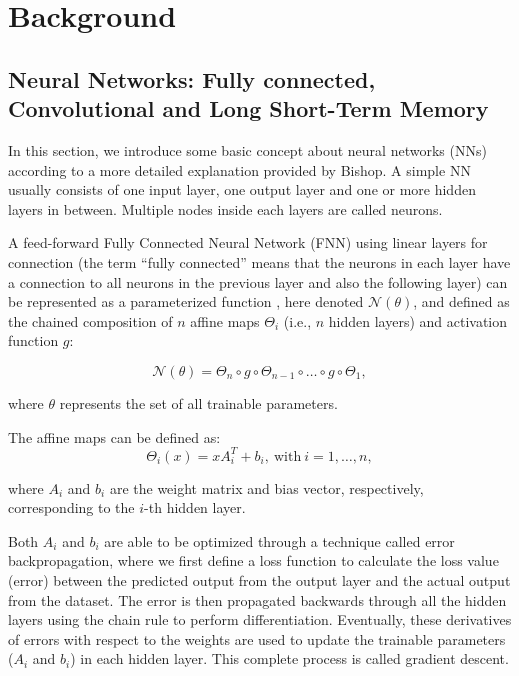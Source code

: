 \chapter{Background}\label{chap:background}


\section{Neural Networks: Fully connected, Convolutional and Long Short-Term Memory}

In this section, we introduce some basic concept about neural networks (NNs) according to a more detailed explanation provided by Bishop. \citep{10.1117_1.2819119} A simple NN usually consists of one input layer, one output layer and one or more hidden layers in between. Multiple nodes inside each layers are called neurons. 

A feed-forward Fully Connected Neural Network (FNN) using linear layers for connection (the term “fully connected” means that the neurons in each layer have a connection to all neurons in the previous layer and also the following layer) can be represented as a parameterized function \citep{2306.06304}, here denoted $\mathcal{N}(\theta)$, and defined as the chained composition of $n$ affine maps $\Theta_i$ (i.e., $n$ hidden layers) and activation function $g$:

\begin{equation*}
\mathcal{N}(\theta) = \Theta_n \circ g \circ \Theta_{n-1} \circ \ldots \circ g \circ \Theta_1,
\end{equation*}

where $\theta$ represents the set of all trainable parameters.

The affine maps can be defined as:
\begin{equation*} 
\Theta_i(x) = xA_i^{T} + b_i, \ \mathrm{with} \ i=1,\ldots,n, 
\end{equation*}

where $A_i$ and $b_i$ are the weight matrix and bias vector, respectively, corresponding to the $i$-th hidden layer.

Both $A_i$ and $b_i$ are able to be optimized through a technique called error backpropagation, where we first define a loss function to calculate the loss value (error) between the predicted output from the output layer and the actual output from the dataset. The error is then propagated backwards through all the hidden layers using the chain rule to perform differentiation. Eventually, these derivatives of errors with respect to the weights are used to update the trainable parameters ($A_i$ and $b_i$) in each hidden layer. This complete process is called gradient descent. 

